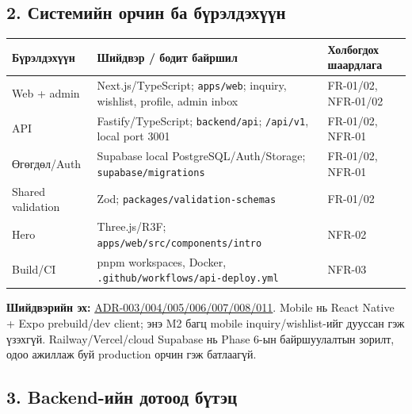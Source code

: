 \documentclass[
  11pt,
  a4paper,
]{article}
\begin{document}
\subsection{2. Системийн орчин ба
бүрэлдэхүүн}\label{doc6-ux441ux438ux441ux442ux435ux43cux438ux439ux43d-ux43eux440ux447ux438ux43d-ux431ux430-ux431ux4afux440ux44dux43bux434ux44dux445ux4afux4afux43d}

\begin{longtable}[]{@{}
  >{\raggedright\arraybackslash}p{}
  >{\raggedright\arraybackslash}p{}
  >{\raggedright\arraybackslash}p{}@{}}
\toprule\noalign{}
\begin{minipage}[b]{\linewidth}\raggedright
Бүрэлдэхүүн
\end{minipage} & \begin{minipage}[b]{\linewidth}\raggedright
Шийдвэр / бодит байршил
\end{minipage} & \begin{minipage}[b]{\linewidth}\raggedright
Холбогдох шаардлага
\end{minipage} \\
\midrule\noalign{}
\endhead
\bottomrule\noalign{}
\endlastfoot
Web + admin & Next.js/TypeScript; \nolinkurl{apps/web}; inquiry,
wishlist, profile, admin inbox & FR-01/02, NFR-01/02 \\
API & Fastify/TypeScript; \nolinkurl{backend/api}; \nolinkurl{/api/v1},
local port 3001 & FR-01/02, NFR-01 \\
Өгөгдөл/Auth & Supabase local PostgreSQL/Auth/Storage;
\nolinkurl{supabase/migrations} & FR-01/02, NFR-01 \\
Shared validation & Zod; \nolinkurl{packages/validation-schemas} &
FR-01/02 \\
Hero & Three.js/R3F; \nolinkurl{apps/web/src/components/intro} &
NFR-02 \\
Build/CI & pnpm workspaces, Docker,
\nolinkurl{.github/workflows/api-deploy.yml} & NFR-03 \\
\end{longtable}

\textbf{Шийдвэрийн эх:}
\href{../../../agent-context/DECISIONS.md}{ADR-003/004/005/006/007/008/011}.
Mobile нь React Native + Expo prebuild/dev client; энэ M2 багц mobile
inquiry/wishlist-ийг дууссан гэж үзэхгүй. Railway/Vercel/cloud Supabase
нь Phase 6-ын байршуулалтын зорилт, одоо ажиллаж буй production орчин
гэж батлаагүй.

\subsection{3. Backend-ийн дотоод
бүтэц}\label{doc6-backend-ux438ux439ux43d-ux434ux43eux442ux43eux43eux434-ux431ux4afux442ux44dux446}
\end{document}
